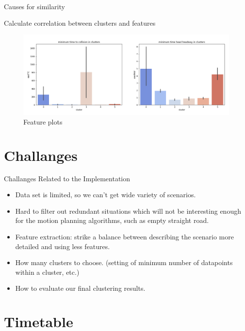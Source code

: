 \documentclass[shortpres]{beamer}
\begin{document}
\begin{frame}{Causes for similarity}

Calculate correlation between clusters and features

\begin{figure}[h!]
  \centering
    \includegraphics[width=\textwidth]{clusters.png}
  \vspace{-2.4em}
  \caption{Feature plots}
\end{figure}

\end{frame}

\section{Challanges}	

\begin{frame}{Challanges Related to the Implementation}	

\begin{itemize} 
\item Data set is limited, so we can't get wide variety of scenarios.
\vfill \item Hard to filter out redundant situations which will not be interesting enough for the motion planning algorithms, such as empty straight road.
\vfill \item Feature extraction: strike a balance between describing the scenario more detailed and using less features.
\vfill \item  How many clusters to choose. (setting of minimum number of datapoints within a cluster, etc.)
\vfill \item  How to evaluate our final clustering results. 
\end{itemize}
\end{frame}

\section{Timetable}	
\end{document}
